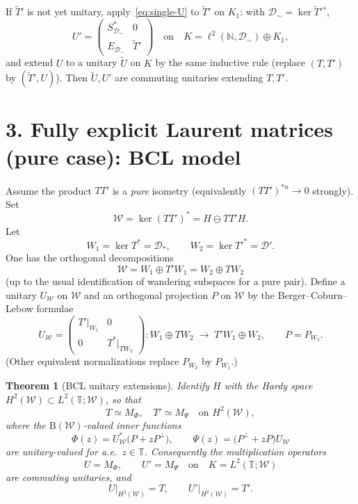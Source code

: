 \documentclass[11pt]{article}
\newtheorem{theorem}{Theorem}
\begin{document}
\medskip
If \(\widetilde{T}'\) is not yet unitary, apply~\eqref{eq:single-U} to \(\widetilde{T}'\) on \(K_1\):
with \(\mathcal{D}_{\sim}=\ker\widetilde{T}'{}^*\),
\begin{equation}
\label{eq:Uprime}
U'
=
\begin{pmatrix}
S_{\mathcal{D}_{\sim}}^* & 0 \\
E_{\mathcal{D}_{\sim}} & \widetilde{T}'
\end{pmatrix}
\quad\text{on}\quad
K=\ell^2(\mathbb{N},\mathcal{D}_{\sim})\oplus K_1,
\end{equation}
and extend \(U\) to a unitary \(\widetilde{U}\) on \(K\) by the same inductive rule
(replace \((T,T')\) by \((\widetilde{T}',U)\)). Then \(\widetilde{U},U'\) are commuting unitaries
extending \(T,T'\).

\bigskip
\section*{3. Fully explicit Laurent matrices (pure case): BCL model}

Assume the product \(TT'\) is a \emph{pure} isometry (equivalently
\((TT')^{*n}\to 0\) strongly). Set
\[
\mathcal{W}=\ker(TT')^*=H\ominus TT'H.
\]
Let
\[
W_1=\ker T^*=\mathcal{D}_*,\qquad
W_2=\ker{T'}^*=\mathcal{D}'.
\]
One has the orthogonal decompositions
\[
\mathcal{W}=W_1\oplus T'W_1=W_2\oplus TW_2
\]
(up to the usual identification of wandering subspaces for a pure pair). Define a unitary
\(U_{\mathcal{W}}\) on \(\mathcal{W}\) and an orthogonal projection \(P\) on \(\mathcal{W}\) by the
Berger--Coburn--Lebow formulae
\begin{equation}
\label{eq:UW-P}
U_{\mathcal{W}}
=
\begin{pmatrix}
T'\big|_{W_1} & 0 \\
0 & T^*\big|_{TW_2}
\end{pmatrix}
:
W_1\oplus TW_2
\;\longrightarrow\;
T'W_1\oplus W_2,
\qquad
P=P_{W_2}.
\end{equation}
(Other equivalent normalizations replace \(P_{W_2}\) by \(P_{W_1}\).)

\begin{theorem}[BCL unitary extensions]
Identify \(H\) with the Hardy space \(H^2(\mathcal{W})\subset L^2(\mathbb{T};\mathcal{W})\), so that
\[
T\simeq M_{\Phi},\quad
T'\simeq M_{\Psi}
\quad\text{on }H^2(\mathcal{W}),
\]
where the \(\mathrm{B}(\mathcal{W})\)-valued inner functions
\begin{equation}
\label{eq:PhiPsi}
\Phi(z)=U_{\mathcal{W}}^*\bigl(P+zP^\perp\bigr),
\qquad
\Psi(z)=\bigl(P^\perp+zP\bigr)U_{\mathcal{W}}
\end{equation}
are \emph{unitary-valued for a.e.\ \(z\in\mathbb{T}\)}. Consequently the multiplication operators
\begin{equation}
\label{eq:UU-L2}
U=M_{\Phi},\qquad U'=M_{\Psi}
\quad\text{on}\quad
K=L^2(\mathbb{T};\mathcal{W})
\end{equation}
are commuting unitaries, and
\[
U\big|_{H^2(\mathcal{W})}=T,\qquad
U'\big|_{H^2(\mathcal{W})}=T'.
\]
\end{theorem}
\end{document}
